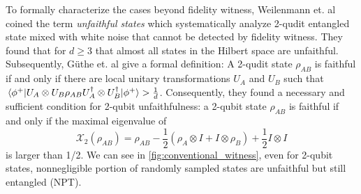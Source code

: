 \documentclass[
aps,
pra,
twocolumn,
floatfix,
]{revtex4-2}
\theoremstyle{plain}
\theoremstyle{definition}
\newtheorem{definition}{Definition}
\newcommand{\dm}{\rho}
\newcommand{\U}{U}
\begin{document}
To formally characterize the cases beyond fidelity witness, Weilenmann et. al \cite{weilenmannEntanglementDetectionMeasuring2020} \cite{huOptimizedDetectionHighDimensional2021} coined the term \emph{unfaithful states} 
which systematically analyze 2-qudit entangled state mixed with white noise that cannot be detected by fidelity witness.
They found that for $d \ge 3$ that almost all states in the Hilbert space are unfaithful. 
Subsequently, G\"{u}the et. al \cite{guhneGeometryFaithfulEntanglement2021} \cite{riccardiExploringRelationshipFaithfulness2021} give a formal definition: 
	A 2-qudit state $\dm_{AB}$ is faithful if and only if there are local unitary transformations $\U_A$ and $\U_B$ such that
	$\expval{\U_A\otimes\U_B \dm_{AB} \U_A^\dagger \otimes\U_B^\dagger}{\phi^+}> \frac{1}{d}$.
Consequently, they found a necessary and sufficient condition for 2-qubit unfaithfulness: 
a 2-qubit state $\dm_{AB}$ is faithful if and only if the maximal eigenvalue of
\begin{equation}
	\mathcal{X}_2( \dm_{AB})=\rho_{AB}-\frac{1}{2}(\dm_{A}\otimes I + I \otimes \dm_{B})+\frac{1}{2} I \otimes I
	\label{eq:unfaithful_2qubit}
\end{equation}
is larger than 1/2.
We can see in \cref{fig:conventional_witness}, even for 2-qubit states, nonnegligible portion of randomly sampled states are unfaithful but still entangled (NPT).
\end{document}
